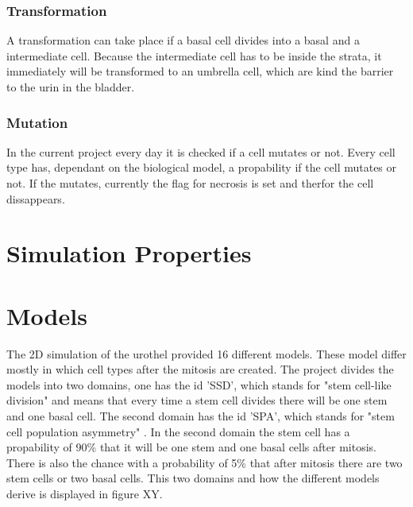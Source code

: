 \subsubsection{Transformation}
A transformation can take place if a basal cell divides into a basal and a intermediate cell. Because the intermediate cell has to be inside the strata, it immediately will be transformed to an umbrella cell, which are kind the barrier to the urin in the bladder.

\subsubsection{Mutation}
In the current project every day it is checked if a cell mutates or not. Every cell type has, dependant on the biological model, a propability if the cell mutates or not. If the mutates, currently the flag for necrosis is set and therfor the cell dissappears.



\section{Simulation Properties}

\section{Models}
The 2D simulation of the urothel provided 16 different models. These model differ mostly in which cell types after the mitosis are created. The project divides the models into two domains, one has the id 'SSD', which stands for "stem cell-like division" \cite{Torelli2017} and means that every time a stem cell divides there will be one stem and one basal cell. The second domain has the id 'SPA', which stands for "stem cell population asymmetry" \cite{Torelli2017}. In the second domain the stem cell has a propability of 90\% that it will be one stem and one basal cells after mitosis. There is also the chance with a probability of 5\% that after mitosis there are two stem cells or two basal cells. This two domains and how the different models derive is displayed in figure XY.




